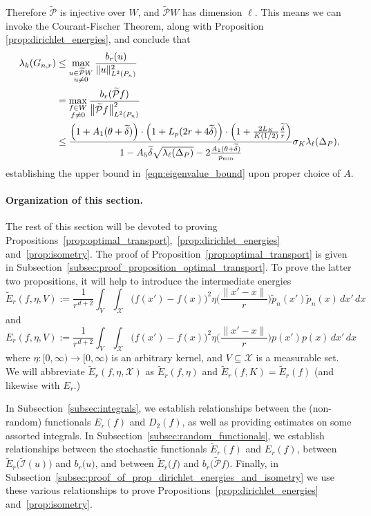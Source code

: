\documentclass{article}
\newcommand{\1}{\mathbf{1}}
\newcommand{\Xset}{\mathcal{X}}
\newcommand{\Leb}{L}
\newcommand{\mc}[1]{\mathcal{#1}}
\newcommand{\wt}[1]{\widetilde{#1}}
\theoremstyle{alden}
\theoremstyle{aldenthm}
\theoremstyle{definition}
\theoremstyle{remark}
\begin{document}
Therefore $\wt{\mc{P}}$ is injective over $W$, and $\wt{\mc{P}}W$ has dimension $\ell$. This means we can invoke the Courant-Fischer Theorem, along with Proposition \ref{prop:dirichlet_energies}, and conclude that
\begin{align*}
\lambda_k(G_{n,r}) & \leq \max_{\substack{u \in \wt{\mc{P}}W \\ u \neq 0} } \frac{b_r(u)}{\|u\|_{\Leb^2(P_n)}^2} \\
& = \max_{\substack{f \in W \\ f \neq 0} } \frac{b_r(\wt{\mc{P}}f)}{\bigl\|\wt{\mc{P}}f\bigr\|_{\Leb^2(P_n)}^2} \\
& \leq \frac{\Bigl(1 + A_1(\theta + \wt{\delta})\Bigr) \cdot \Bigl(1 + L_p(2r + 4\wt{\delta})\Bigr) \cdot \Bigl(1 + \frac{2L_K}{K(1/2)}\frac{\wt{\delta}}{r}\Bigr)}{1 - A_5\wt{\delta} \sqrt{\lambda_{\ell}(\Delta_P)} - 2\frac{A_1(\theta + \wt{\delta})}{p_{\min}}} \sigma_K \lambda_{\ell}(\Delta_P),
\end{align*}
establishing the upper bound in~\eqref{eqn:eigenvalue_bound} upon proper choice of $A$.

\paragraph{Organization of this section.}
The rest of this section will be devoted to proving Propositions~\ref{prop:optimal_transport},~\ref{prop:dirichlet_energies} and~\ref{prop:isometry}. The proof of Proposition~\ref{prop:optimal_transport} is given in Subsection~\ref{subsec:proof_proposition_optimal_transport}. To prove the latter two propositions, it will help to introduce the intermediate energies
\begin{equation*}
\wt{E}_r(f,\eta,V) := \frac{1}{r^{d + 2}}\int_{V} \int_{\Xset} \bigl(f(x') - f(x)\bigr)^2 \eta\biggl(\frac{\|x' - x\|}{r}\biggr) \wt{p}_n(x') \wt{p}_n(x) \,dx' \,dx
\end{equation*}
and
\begin{equation*}
{E}_r(f,\eta,V) := \frac{1}{r^{d + 2}}\int_{V} \int_{\Xset} \bigl(f(x') - f(x)\bigr)^2 \eta\biggl(\frac{\|x' - x\|}{r}\biggr) p(x') p(x) \,dx' \,dx
\end{equation*}
where $\eta: [0,\infty) \to [0,\infty)$ is an arbitrary kernel, and $V \subseteq \Xset$ is a measurable set. We will abbreviate $\wt{E}_r(f,\eta,\Xset)$ as $\wt{E}_r(f,\eta)$ and $\wt{E}_r(f,K) = \wt{E}_r(f)$ (and likewise with $E_r$.)

In Subsection~\ref{subsec:integrals}, we establish relationships between the (non-random) functionals $E_r(f)$ and $D_2(f)$, as well as providing estimates on some assorted integrals. In Subsection~\ref{subsec:random_functionals}, we establish relationships between the stochastic functionals $\wt{E}_r(f)$ and $E_r(f)$,  between $\wt{E}_r\bigl(\wt{\mc{I}}(u)\bigr)$ and $b_r\bigl(u\bigr)$, and between $\wt{E}_r\bigl(f\bigr)$ and $b_r\bigl(\wt{\mc{P}}f\bigr)$. Finally, in Subsection~\ref{subsec:proof_of_prop_dirichlet_energies_and_isometry} we use these various relationships to prove Propositions~\ref{prop:dirichlet_energies} and~\ref{prop:isometry}.
\end{document}
